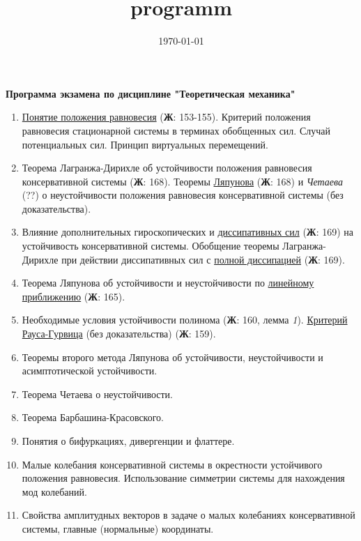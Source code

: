 \documentclass[a4paper,12pt]{article}
\title{programm}
\date{\today}
\newcommand{\jur}[1]{\textbf{Ж}: #1}
\begin{document}
	\begin{center}
		\large\textbf{Программа экзамена по дисциплине "Теоретическая механика"}
	\end{center}
	\begin{enumerate}
	\item \underline{Понятие положения равновесия} (\jur{153-155}). Критерий положения равновесия стационарной системы в терминах обобщенных сил. Случай потенциальных сил. Принцип  виртуальных перемещений.
	
	\item Теорема  Лагранжа-Дирихле  об  устойчивости положения равновесия консервативной  системы (\jur{168}). Теоремы \underline{Ляпунова} (\jur{168}) и \textit{Четаева} (??) о неустойчивости положения равновесия консервативной системы (без доказательства).
	
	\item Влияние дополнительных гироскопических и \underline{диссипативных сил} (\jur{169}) на устойчивость консервативной системы. Обобщение теоремы Лагранжа-Дирихле при действии диссипативных сил с \underline{полной диссипацией} (\jur{169}).
	
	\item Теорема Ляпунова об устойчивости и неустойчивости по \underline{линейному приближению} (\jur{165}). 
	
	\item Необходимые условия устойчивости полинома (\jur{160}, лемма \textit{1}). \underline{Критерий  Рауса-Гурвица} (без доказательства) (\jur{159}).
	
	\item Теоремы второго метода Ляпунова об устойчивости, неустойчивости и асимптотической устойчивости.
	
	\item Теорема Четаева о неустойчивости.
	
	\item Теорема Барбашина-Красовского.
	
	\item Понятия о бифуркациях, дивергенции и флаттере. 
	
	\item Малые колебания консервативной системы в окрестности устойчивого положения  равновесия. Использование симметрии системы для нахождения мод колебаний.
	
	\item Свойства амплитудных векторов в задаче о малых колебаниях консервативной системы, главные (нормальные) координаты.
	

\end{enumerate}
\end{document}

